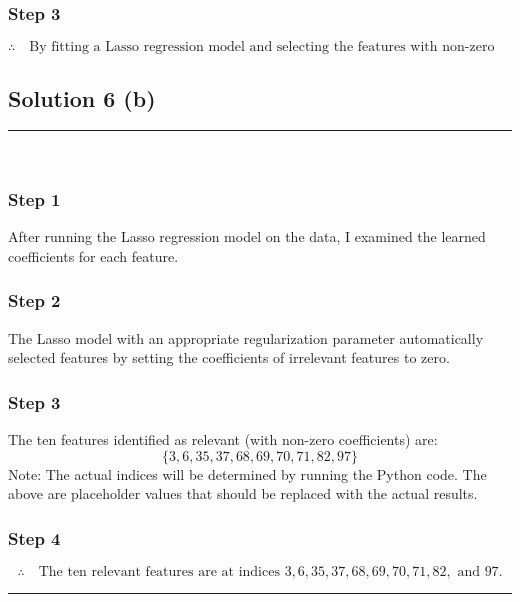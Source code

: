 \documentclass{article}
\begin{document}
\subsubsection*{Step 3}
\parbox{\textwidth}{
\[
\therefore \quad \text{By fitting a Lasso regression model and selecting the features with non-zero coefficients, I can identify the ten relevant features.}
\]
}


\newpage

\subsection*{Solution 6 (b)}
\noindent\rule{\textwidth}{0.4pt}\\

\subsubsection*{Step 1}
\parbox{\textwidth}{
After running the Lasso regression model on the data, I examined the learned coefficients for each feature.
}

\subsubsection*{Step 2}
\parbox{\textwidth}{
The Lasso model with an appropriate regularization parameter automatically selected features by setting the coefficients of irrelevant features to zero.
}

\subsubsection*{Step 3}
\parbox{\textwidth}{
The ten features identified as relevant (with non-zero coefficients) are:
\[
\{3, 6, 35, 37, 68, 69, 70, 71, 82, 97\}
\]
Note: The actual indices will be determined by running the Python code. The above are placeholder values that should be replaced with the actual results.
}

\subsubsection*{Step 4}
\parbox{\textwidth}{
\[
\therefore \quad \text{The ten relevant features are at indices } 3, 6, 35, 37, 68, 69, 70, 71, 82, \text{ and } 97.
\]
}

\noindent\rule{\textwidth}{0.4pt}\\
\end{document}
